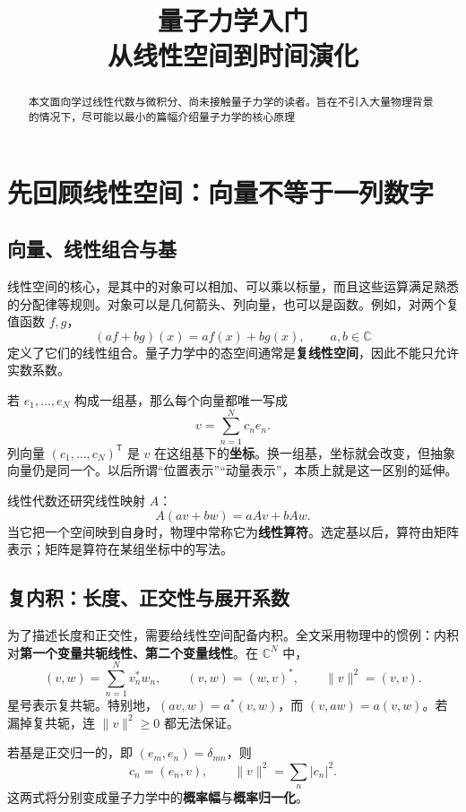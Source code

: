 \documentclass[a4paper,11pt]{article}
\title{\vspace{-1.5em}\textbf{量子力学入门}\\[.35em]\large 从线性空间到时间演化}
\author{}
\date{}
\numberwithin{equation}{section}
\newcommand{\norm}[1]{\lVert #1\rVert}
\newcommand{\abs}[1]{\lvert #1\rvert}
\begin{document}
\maketitle
\vspace{-2.5em}
\begin{abstract}
本文面向学过线性代数与微积分、尚未接触量子力学的读者。旨在不引入大量物理背景的情况下，尽可能以最小的篇幅介绍量子力学的核心原理
\end{abstract}

\vspace{.6em}

\section{先回顾线性空间：向量不等于一列数字}
\subsection{向量、线性组合与基}
线性空间的核心，是其中的对象可以相加、可以乘以标量，而且这些运算满足熟悉的分配律等规则。对象可以是几何箭头、列向量，也可以是函数。例如，对两个复值函数 $f,g$，
\[
  (af+bg)(x)=af(x)+bg(x),\qquad a,b\in\mathbb C
\]
定义了它们的线性组合。量子力学中的态空间通常是\textbf{复线性空间}，因此不能只允许实数系数。

若 $e_1,\ldots,e_N$ 构成一组基，那么每个向量都唯一写成
\[
  v=\sum_{n=1}^N c_n e_n.
\]
列向量 $(c_1,\ldots,c_N)^{\mathsf T}$ 是 $v$ 在这组基下的\textbf{坐标}。换一组基，坐标就会改变，但抽象向量仍是同一个。以后所谓“位置表示”“动量表示”，本质上就是这一区别的延伸。

线性代数还研究线性映射 $A$：
\[
  A(av+bw)=aAv+bAw.
\]
当它把一个空间映到自身时，物理中常称它为\textbf{线性算符}。选定基以后，算符由矩阵表示；矩阵是算符在某组坐标中的写法。

\subsection{复内积：长度、正交性与展开系数}
为了描述长度和正交性，需要给线性空间配备内积。全文采用物理中的惯例：内积对\textbf{第一个变量共轭线性、第二个变量线性}。在 $\mathbb C^N$ 中，
\[
  (v,w)=\sum_{n=1}^N v_n^*w_n,\qquad
  (v,w)=(w,v)^*,\qquad \norm{v}^2=(v,v).
\]
星号表示复共轭。特别地，$(av,w)=a^*(v,w)$，而 $(v,aw)=a(v,w)$。若漏掉复共轭，连 $\norm{v}^2\geq0$ 都无法保证。

若基是正交归一的，即 $(e_m,e_n)=\delta_{mn}$，则
\[
  c_n=(e_n,v),\qquad \norm{v}^2=\sum_n\abs{c_n}^2.
\]
这两式将分别变成量子力学中的\textbf{概率幅}与\textbf{概率归一化}。
\end{document}
